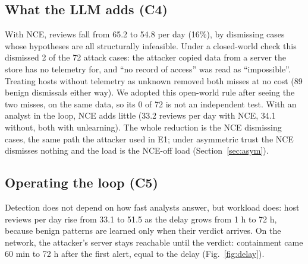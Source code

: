 \documentclass[conference]{IEEEtran}
\begin{document}
\begin{table}[t]
\caption{Analyst mistakes, without / with unlearning (host logs, 4 h delay).}\label{tab:c3}
\centering\small
{}
\end{table}

\subsection{What the LLM adds (C4)}\label{sec:c4}
With NCE, reviews fall from 65.2 to 54.8 per day (16\%), by dismissing cases whose hypotheses are all structurally
infeasible. Under a closed-world check this dismissed 2 of the 72 attack cases: the attacker copied data from a
server the store has no telemetry for, and ``no record of access'' was read as ``impossible''. Treating hosts
without telemetry as unknown removed both misses at no cost (89 benign dismissals either way). We adopted this
open-world rule after seeing the two misses, on the same data, so its 0 of 72 is not an independent test. With an analyst
in the loop, NCE adds little (33.2 reviews per day with NCE, 34.1 without, both with unlearning). The whole
reduction is the NCE dismissing cases, the same path the attacker used in E1; under asymmetric trust the NCE
dismisses nothing and the load is the NCE-off load (Section~\ref{sec:asym}).

\subsection{Operating the loop (C5)}
Detection does not depend on how fast analysts answer, but workload does: host reviews per day rise from 33.1 to
51.5 as the delay grows from 1 h to 72 h, because benign patterns are learned only when their verdict arrives.
On the network, the attacker's server stays reachable until the verdict: containment came 60 min to 72 h after the
first alert, equal to the delay (Fig.~\ref{fig:delay}).
\end{document}
